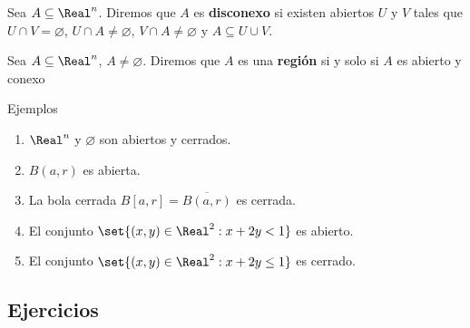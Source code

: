 \begin{frame}
\begin{defn}
  Sea $A\subseteq\Real^n$. Diremos que $A$ es \textbf{disconexo} si existen abiertos $U$ y $V$ tales que $U\cap V=\varnothing$, $U\cap A\neq\varnothing$, $V\cap A\neq\varnothing$ y $A\subseteq U\cup V$.
\end{defn}
\end{frame}

\begin{frame}
\begin{defn}
Sea $A\subseteq\Real^n$, $A\neq\varnothing$. Diremos que $A$ es una \textbf{región} si y solo si $A$ es abierto y conexo
\end{defn}
\end{frame}

\begin{frame}{Ejemplos}
\begin{enumerate}
  \item $\Real^n$ y $\varnothing$ son abiertos y cerrados.
  \item $B(a,r)$ es abierta.
  \item La bola cerrada $B[a,r]=\overline{B(a,r)}$ es cerrada.
  \item El conjunto $\set{(x,y)\in\Real^2:x+2y<1}$ es abierto.
  \item El conjunto $\set{(x,y)\in\Real^2:x+2y\leq1}$ es cerrado.
\end{enumerate}
\end{frame}

\subsection{Ejercicios}
\begin{frame}
\subsectionpage
\end{frame}


